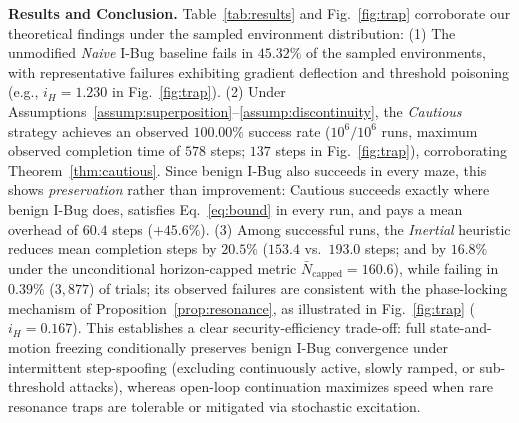 \documentclass[10pt, a4paper, twocolumn]{article}
\begin{document}
\begin{table}[htbp]
\centering
\scriptsize
\setlength{\tabcolsep}{2.2pt}
\vspace{-0.4em}
\caption{Paired Evaluation ($10^6$ Runs; Step Stats on Succ.\ vs.\ Capped All)}
\label{tab:results}
\vspace{-1.2em}
\end{table}

\noindent\textbf{Results and Conclusion.}
Table~\ref{tab:results} and Fig.~\ref{fig:trap} corroborate our theoretical findings under the sampled environment distribution:
(1) The unmodified \textit{Naive} I-Bug baseline fails in $45.32\%$ of the sampled environments, with representative failures exhibiting gradient deflection and threshold poisoning (e.g., $i_H = 1.230$ in Fig.~\ref{fig:trap}).
(2) Under Assumptions~\ref{assump:superposition}--\ref{assump:discontinuity}, the \textit{Cautious} strategy achieves an observed $100.00\%$ success rate ($10^6 / 10^6$ runs, maximum observed completion time of $578$ steps; $137$ steps in Fig.~\ref{fig:trap}), corroborating Theorem~\ref{thm:cautious}. Since benign I-Bug also succeeds in every maze, this shows \emph{preservation} rather than improvement: Cautious succeeds exactly where benign I-Bug does, satisfies Eq.~\eqref{eq:bound} in every run, and pays a mean overhead of $60.4$ steps ($+45.6\%$).
(3) Among successful runs, the \textit{Inertial} heuristic reduces mean completion steps by $20.5\%$ ($153.4$ vs.\ $193.0$ steps; and by $16.8\%$ under the unconditional horizon-capped metric $\bar{N}_{\text{capped}} = 160.6$), while failing in $0.39\%$ ($3,877$) of trials; its observed failures are consistent with the phase-locking mechanism of Proposition~\ref{prop:resonance}, as illustrated in Fig.~\ref{fig:trap} ($i_H = 0.167$). This establishes a clear security-efficiency trade-off: full state-and-motion freezing conditionally preserves benign I-Bug convergence under intermittent step-spoofing (excluding continuously active, slowly ramped, or sub-threshold attacks), whereas open-loop continuation maximizes speed when rare resonance traps are tolerable or mitigated via stochastic excitation.
\end{document}
